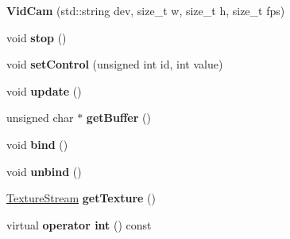 \begin{DoxyCompactItemize}
\item 
\hypertarget{classs9_1_1gl_1_1VidCam_ab7b7d40a63010fe4f660960a938c933e}{{\bfseries \-Vid\-Cam} (std\-::string dev, size\-\_\-t w, size\-\_\-t h, size\-\_\-t fps)}\label{classs9_1_1gl_1_1VidCam_ab7b7d40a63010fe4f660960a938c933e}

\item 
\hypertarget{classs9_1_1gl_1_1VidCam_a776223db7cf76959916b0adac5304334}{void {\bfseries stop} ()}\label{classs9_1_1gl_1_1VidCam_a776223db7cf76959916b0adac5304334}

\item 
\hypertarget{classs9_1_1gl_1_1VidCam_af84be51c46c1262095841f2c8cad309e}{void {\bfseries set\-Control} (unsigned int id, int value)}\label{classs9_1_1gl_1_1VidCam_af84be51c46c1262095841f2c8cad309e}

\item 
\hypertarget{classs9_1_1gl_1_1VidCam_ad9923fb1bed89ffeb660c1a8fc44e44a}{void {\bfseries update} ()}\label{classs9_1_1gl_1_1VidCam_ad9923fb1bed89ffeb660c1a8fc44e44a}

\item 
\hypertarget{classs9_1_1gl_1_1VidCam_a3d838a3a1eba7d7dbc2e2295f8e6b8be}{unsigned char $\ast$ {\bfseries get\-Buffer} ()}\label{classs9_1_1gl_1_1VidCam_a3d838a3a1eba7d7dbc2e2295f8e6b8be}

\item 
\hypertarget{classs9_1_1gl_1_1VidCam_a6650fae05fc02a3b8c8d5940fb6cdfc6}{void {\bfseries bind} ()}\label{classs9_1_1gl_1_1VidCam_a6650fae05fc02a3b8c8d5940fb6cdfc6}

\item 
\hypertarget{classs9_1_1gl_1_1VidCam_af250738be8d821de4fea4b651f17ed29}{void {\bfseries unbind} ()}\label{classs9_1_1gl_1_1VidCam_af250738be8d821de4fea4b651f17ed29}

\item 
\hypertarget{classs9_1_1gl_1_1VidCam_ac761bc22ec13a4c2f5da46ecadff207d}{\hyperlink{classs9_1_1gl_1_1TextureStream}{\-Texture\-Stream} {\bfseries get\-Texture} ()}\label{classs9_1_1gl_1_1VidCam_ac761bc22ec13a4c2f5da46ecadff207d}

\item 
\hypertarget{classs9_1_1gl_1_1VidCam_a00065c23817f840f6b843646394a8e9b}{virtual {\bfseries operator int} () const }\label{classs9_1_1gl_1_1VidCam_a00065c23817f840f6b843646394a8e9b}

\end{DoxyCompactItemize}
